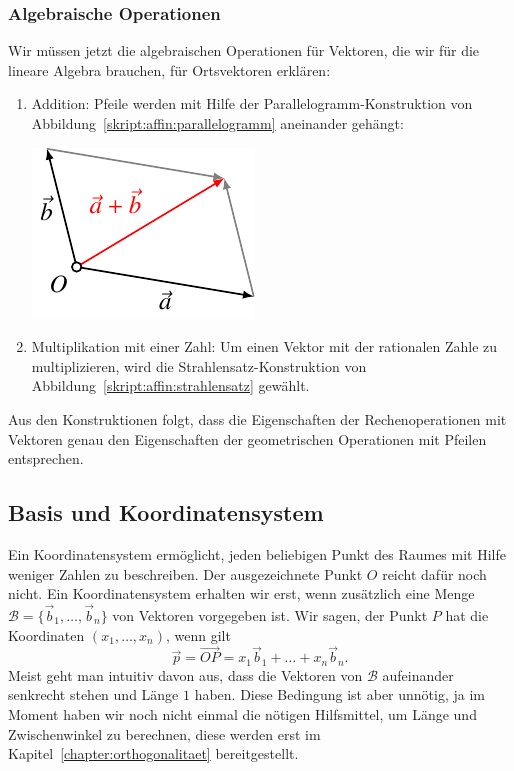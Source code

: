 \subsubsection{Algebraische Operationen}
Wir müssen jetzt die algebraischen Operationen für Vektoren,
die wir für die lineare Algebra brauchen, für Ortsvektoren erklären:
\begin{enumerate}
\item
Addition: Pfeile werden mit Hilfe der Parallelogramm-Konstruktion
von Abbildung~\ref{skript:affin:parallelogramm}
aneinander gehängt:
\begin{center}
\includegraphics{3/images/addition.pdf}
\end{center}
\item
Multiplikation mit einer Zahl: Um einen Vektor mit der rationalen
Zahle zu multiplizieren, wird die Strahlensatz-Konstruktion
von Abbildung~\ref{skript:affin:strahlensatz} gewählt.
\end{enumerate}
Aus den Konstruktionen folgt, dass die Eigenschaften der Rechenoperationen
mit Vektoren genau den Eigenschaften der geometrischen Operationen
mit Pfeilen entsprechen.

%
%
\subsection{Basis und Koordinatensystem}
Ein Koordinatensystem ermöglicht, jeden beliebigen Punkt des Raumes mit
Hilfe weniger Zahlen zu beschreiben.
Der ausgezeichnete Punkt $O$ reicht dafür noch nicht. 
Ein Koordinatensystem erhalten wir erst, wenn zusätzlich eine Menge
$\mathcal{B}=\{\vec{b}_1,\dots,\vec{b}_n\}$ von Vektoren vorgegeben ist.
Wir sagen, der Punkt $P$ hat die Koordinaten $(x_1,\dots,x_n)$, wenn 
gilt
\[
\vec{p}=\overrightarrow{OP} = x_1\vec{b}_1+\dots+x_n\vec{b}_n.
\]
Meist geht man intuitiv davon aus, dass die Vektoren von $\mathcal{B}$
aufeinander senkrecht stehen und Länge $1$ haben.
Diese Bedingung
ist aber unnötig, ja im Moment haben wir noch nicht einmal die
nötigen Hilfsmittel, um Länge und Zwischenwinkel zu berechnen, diese
werden erst im Kapitel~\ref{chapter:orthogonalitaet} bereitgestellt.

